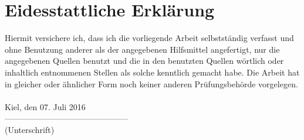 \chapter*{Eidesstattliche Erklärung}
\label{sec:erklaerung}

Hiermit versichere ich, dass ich die vorliegende Arbeit selbstständig verfasst und ohne Benutzung
anderer als der angegebenen Hilfsmittel angefertigt, nur die angegebenen Quellen benutzt und die
in den benutzten Quellen wörtlich oder inhaltlich entnommenen Stellen als solche kenntlich
gemacht habe.
Die Arbeit hat in gleicher oder ähnlicher Form noch keiner anderen Prüfungsbehörde vorgelegen.\\
\\[1.5cm]
Kiel, den 07. Juli 2016
\\[2cm]
---------------------------------------------
\\
\enspace (Unterschrift)
